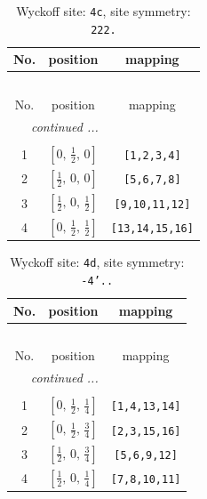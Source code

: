 \documentclass[fleqn,8pt]{jsarticle}
\begin{document}
\renewcommand{\arraystretch}{1.2}
\begin{longtable}{ccc}
\caption{Wyckoff site: {\tt 4c}, site symmetry: {\tt 222.}}
 \\
 \hline \hline
No. & position & mapping \\ \hline \endfirsthead

\multicolumn{2}{l}{\tablename\ \thetable{}} \\
 \hline \hline
No. & position & mapping \\ \hline \endhead

 \hline \hline
\multicolumn{2}{r}{\footnotesize\it continued ...} \\ \endfoot

 \hline \hline
\multicolumn{2}{r}{} \\ \endlastfoot

1 & $\left[ 0,\, \frac{1}{2},\, 0 \right]$ & {\tt [1,2,3,4]} \\ \hline
2 & $\left[ \frac{1}{2},\, 0,\, 0 \right]$ & {\tt [5,6,7,8]} \\ \hline
3 & $\left[ \frac{1}{2},\, 0,\, \frac{1}{2} \right]$ & {\tt [9,10,11,12]} \\ \hline
4 & $\left[ 0,\, \frac{1}{2},\, \frac{1}{2} \right]$ & {\tt [13,14,15,16]} \\
\end{longtable}
\renewcommand{\arraystretch}{1.2}
\begin{longtable}{ccc}
\caption{Wyckoff site: {\tt 4d}, site symmetry: {\tt -4'..}}
 \\
 \hline \hline
No. & position & mapping \\ \hline \endfirsthead

\multicolumn{2}{l}{\tablename\ \thetable{}} \\
 \hline \hline
No. & position & mapping \\ \hline \endhead

 \hline \hline
\multicolumn{2}{r}{\footnotesize\it continued ...} \\ \endfoot

 \hline \hline
\multicolumn{2}{r}{} \\ \endlastfoot

1 & $\left[ 0,\, \frac{1}{2},\, \frac{1}{4} \right]$ & {\tt [1,4,13,14]} \\ \hline
2 & $\left[ 0,\, \frac{1}{2},\, \frac{3}{4} \right]$ & {\tt [2,3,15,16]} \\ \hline
3 & $\left[ \frac{1}{2},\, 0,\, \frac{3}{4} \right]$ & {\tt [5,6,9,12]} \\ \hline
4 & $\left[ \frac{1}{2},\, 0,\, \frac{1}{4} \right]$ & {\tt [7,8,10,11]} \\
\end{longtable}
\end{document}
